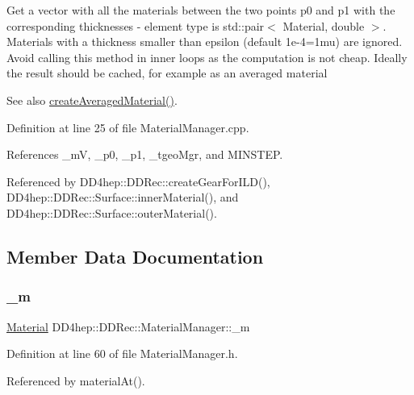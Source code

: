Get a vector with all the materials between the two points p0 and p1 with the corresponding thicknesses -\/ element type is std\+::pair$<$ Material, double $>$. Materials with a thickness smaller than epsilon (default 1e-\/4=1mu) are ignored. Avoid calling this method in inner loops as the computation is not cheap. Ideally the result should be cached, for example as an averaged material \begin{DoxySeeAlso}{See also}
\hyperlink{class_d_d4hep_1_1_d_d_rec_1_1_material_manager_a44243f88b984a698c8b823885c439702}{create\+Averaged\+Material()}. 
\end{DoxySeeAlso}


Definition at line 25 of file Material\+Manager.\+cpp.



References \+\_\+mV, \+\_\+p0, \+\_\+p1, \+\_\+tgeo\+Mgr, and M\+I\+N\+S\+T\+EP.



Referenced by D\+D4hep\+::\+D\+D\+Rec\+::create\+Gear\+For\+I\+L\+D(), D\+D4hep\+::\+D\+D\+Rec\+::\+Surface\+::inner\+Material(), and D\+D4hep\+::\+D\+D\+Rec\+::\+Surface\+::outer\+Material().



\subsection{Member Data Documentation}
\hypertarget{class_d_d4hep_1_1_d_d_rec_1_1_material_manager_a9959722f6a2058c3058c1bc06660f8f1}{}\label{class_d_d4hep_1_1_d_d_rec_1_1_material_manager_a9959722f6a2058c3058c1bc06660f8f1} 
\subsubsection{\texorpdfstring{\+\_\+m}{\_m}}
{\footnotesize\ttfamily \hyperlink{class_d_d4hep_1_1_geometry_1_1_material}{Material} D\+D4hep\+::\+D\+D\+Rec\+::\+Material\+Manager\+::\+\_\+m\hspace{0.3cm}{\ttfamily [protected]}}



Definition at line 60 of file Material\+Manager.\+h.



Referenced by material\+At().

